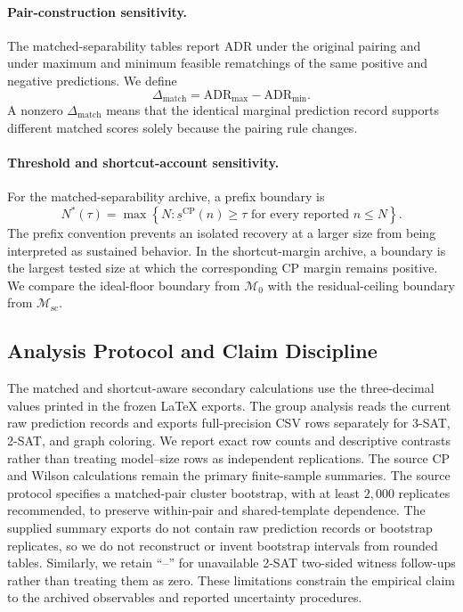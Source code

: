 \documentclass[acmsmall,screen,review,anonymous]{acmart}
\providecommand{\ADR}{\mathrm{ADR}}
\providecommand{\SepCP}{\underline{s}^{\mathrm{CP}}}
\providecommand{\Dmatch}{\Delta_{\mathrm{match}}}
\providecommand{\MarginZero}{\mathcal{M}_{0}}
\providecommand{\MarginShortcut}{\mathcal{M}_{\mathrm{sc}}}
\begin{document}
\paragraph{Pair-construction sensitivity.}
The matched-separability tables report ADR under the original pairing and
under maximum and minimum feasible rematchings of the same positive and
negative predictions. We define
\[
\Dmatch
=
\ADR_{\max}-\ADR_{\min}.
\]
A nonzero \(\Dmatch\) means that the identical marginal prediction record
supports different matched scores solely because the pairing rule changes.

\paragraph{Threshold and shortcut-account sensitivity.}
For the matched-separability archive, a prefix boundary is
\[
N^{*}(\tau)
=
\max\left\{
N:
\SepCP(n)\ge\tau
\text{ for every reported }n\le N
\right\}.
\]
The prefix convention prevents an isolated recovery at a larger size from
being interpreted as sustained behavior. In the shortcut-margin archive, a
boundary is the largest tested size at which the corresponding CP margin
remains positive. We compare the ideal-floor boundary from \(\MarginZero\) with
the residual-ceiling boundary from \(\MarginShortcut\).

\subsection{Analysis Protocol and Claim Discipline}
\label{sec:analysis-protocol}

The matched and shortcut-aware secondary calculations use the three-decimal
values printed in the
frozen LaTeX exports. The group analysis reads the current raw prediction
records and exports full-precision CSV rows separately for 3-SAT, 2-SAT, and
graph coloring. We report exact row counts and
descriptive contrasts rather than treating model--size rows as independent
replications. The source CP and
Wilson calculations remain the primary finite-sample summaries. The source
protocol specifies a matched-pair cluster bootstrap, with at least \(2{,}000\)
replicates recommended, to preserve within-pair and shared-template
dependence. The supplied summary exports do not contain raw prediction records
or bootstrap replicates, so we do not reconstruct or invent bootstrap
intervals from rounded tables. Similarly, we retain ``--'' for unavailable
2-SAT two-sided witness follow-ups rather than treating them as zero. These
limitations constrain the empirical claim to the archived observables and
reported uncertainty procedures.
\end{document}
